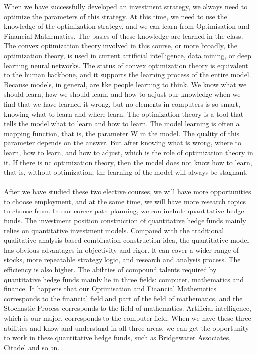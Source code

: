 \documentclass{article}
\begin{document}
    When we have successfully developed an investment strategy, we always need to optimize the parameters of this strategy. At this time, we need to use the knowledge of the optimization strategy, and we can learn from Optimisation and Financial Mathematics. The basics of these knowledge are learned in the class. The convex optimization theory involved in this course, or more broadly, the optimization theory, is used in current artificial intelligence, data mining, or deep learning neural networks. The status of convex optimization theory is equivalent to the human backbone, and it supports the learning process of the entire model. Because models, in general, are like people learning to think. We know what we should learn, how we should learn, and how to adjust our knowledge when we find that we have learned it wrong, but no elements in computers is so smart, knowing what to learn and where learn. The optimization theory is a tool that tells the model what to learn and how to learn. The model learning is often a mapping function, that is, the parameter W in the model. The quality of this parameter depends on the answer. But after knowing what is wrong, where to learn, how to learn, and how to adjust, which is the role of optimization theory in it. If there is no optimization theory, then the model does not know how to learn, that is, without optimization, the learning of the model will always be stagnant.\\
    \\
    After we have studied these two elective courses, we will have more opportunities to choose employment, and at the same time, we will have more research topics to choose from. In our career path planning, we can include quantitative hedge funds. The investment position construction of quantitative hedge funds mainly relies on quantitative investment models. Compared with the traditional qualitative analysis-based combination construction idea, the quantitative model has obvious advantages in objectivity and rigor. It can cover a wider range of stocks, more repeatable strategy logic, and research and analysis process. The efficiency is also higher. The abilities of compound talents required by quantitative hedge funds mainly lie in three fields: computer, mathematics and finance. It happens that our Optimisation and Financial Mathematics corresponds to the financial field and part of the field of mathematics, and the Stochastic Process corresponds to the field of mathematics. Artificial intelligence, which is our major, corresponds to the computer field. When we have these three abilities and know and understand in all three areas, we can get the opportunity to work in these quantitative hedge funds, such as Bridgewater Associates, Citadel and so on.\\
\end{document}
